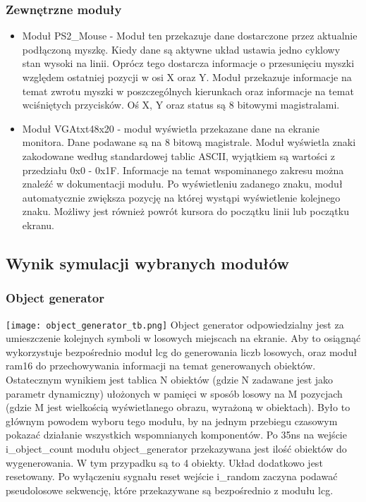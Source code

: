 \documentclass[polish,polish,a4paper]{article}
\begin{document}
\subsubsection{Zewnętrzne moduły}
\begin{itemize}
 \item
  Moduł PS2\_Mouse - Moduł ten przekazuje dane dostarczone przez aktualnie podłączoną myszkę.
  Kiedy dane są aktywne układ ustawia jedno cyklowy stan wysoki na linii.
  Oprócz tego dostarcza informacje o przesunięciu myszki względem ostatniej pozycji w osi X oraz Y.
  Moduł przekazuje informacje na temat zwrotu myszki w poszczególnych kierunkach oraz informacje na temat wciśniętych przycisków.
  Oś X, Y oraz status są 8 bitowymi magistralami.

 \item
  Moduł VGAtxt48x20 - moduł wyświetla przekazane dane na ekranie monitora.
  Dane podawane są na 8 bitową magistrale.
  Moduł wyświetla znaki zakodowane według standardowej tablic ASCII, wyjątkiem są wartości z przedziału 0x0 - 0x1F.
  Informacje na temat wspominanego zakresu można znaleźć w dokumentacji modułu.
  Po wyświetleniu zadanego znaku, moduł automatycznie zwiększa pozycję na której wystąpi wyświetlenie kolejnego znaku.
  Możliwy jest również powrót kursora do początku linii lub początku ekranu.

\end{itemize}
\subsection{Wynik symulacji wybranych modułów }
\subsubsection{Object generator}
\texttt{[image: object\_generator\_tb.png]}
\break
Object generator odpowiedzialny jest za umieszczenie kolejnych symboli w losowych miejscach na ekranie.
Aby to osiągnąć wykorzystuje bezpośrednio moduł lcg do generowania liczb losowych, oraz moduł ram16
do przechowywania informacji na temat generowanych obiektów.
Ostatecznym wynikiem jest tablica N obiektów (gdzie N zadawane jest jako parametr dynamiczny) ułożonych
w pamięci w sposób losowy na M pozycjach (gdzie M jest wielkością wyświetlanego obrazu, wyrażoną w obiektach).
Było to głównym powodem wyboru tego modułu, by na jednym przebiegu czasowym pokazać działanie wszystkich wspomnianych komponentów.
Po 35ns na wejście i\_object\_count modułu object\_generator przekazywana jest ilość obiektów do wygenerowania.
W tym przypadku są to 4 obiekty.
Układ dodatkowo jest resetowany.
Po wyłączeniu sygnału reset wejście i\_random zaczyna podawać pseudolosowe sekwencję, które przekazywane
są bezpośrednio z modułu lcg.
\end{document}
